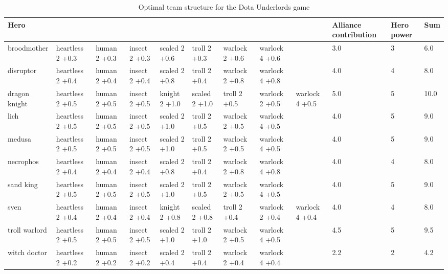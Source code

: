 \documentclass{article}
\begin{document}
\begin{table}
\resizebox{16cm}{!} {
\begin{tabular}{l| *{8}{p{1.6cm}} | *{3}{ p{1cm}} }
{Hero} &                   &               &                &                &                &                  &                  &                  &  Alliance contribution &  Hero power &   Sum \\
\midrule
broodmother   &  heartless 2 +0.3  &  human 2 +0.3  &  insect 2 +0.3  &  scaled 2 +0.6  &   troll 2 +0.3  &  warlock  2 +0.6  &  warlock  4 +0.6  &                   &                  3.0 &           3 &   6.0 \\
disruptor     &  heartless 2 +0.4  &  human 2 +0.4  &  insect 2 +0.4  &  scaled 2 +0.8  &   troll 2 +0.4  &  warlock  2 +0.8  &  warlock  4 +0.8  &                   &                  4.0 &           4 &   8.0 \\
dragon knight &  heartless 2 +0.5  &  human 2 +0.5  &  insect 2 +0.5  &  knight 2 +1.0  &  scaled 2 +1.0  &     troll 2 +0.5  &  warlock  2 +0.5  &  warlock  4 +0.5  &                  5.0 &           5 &  10.0 \\
lich          &  heartless 2 +0.5  &  human 2 +0.5  &  insect 2 +0.5  &  scaled 2 +1.0  &   troll 2 +0.5  &  warlock  2 +0.5  &  warlock  4 +0.5  &                   &                  4.0 &           5 &   9.0 \\
medusa        &  heartless 2 +0.5  &  human 2 +0.5  &  insect 2 +0.5  &  scaled 2 +1.0  &   troll 2 +0.5  &  warlock  2 +0.5  &  warlock  4 +0.5  &                   &                  4.0 &           5 &   9.0 \\
necrophos     &  heartless 2 +0.4  &  human 2 +0.4  &  insect 2 +0.4  &  scaled 2 +0.8  &   troll 2 +0.4  &  warlock  2 +0.8  &  warlock  4 +0.8  &                   &                  4.0 &           4 &   8.0 \\
sand king     &  heartless 2 +0.5  &  human 2 +0.5  &  insect 2 +0.5  &  scaled 2 +1.0  &   troll 2 +0.5  &  warlock  2 +0.5  &  warlock  4 +0.5  &                   &                  4.0 &           5 &   9.0 \\
sven          &  heartless 2 +0.4  &  human 2 +0.4  &  insect 2 +0.4  &  knight 2 +0.8  &  scaled 2 +0.8  &     troll 2 +0.4  &  warlock  2 +0.4  &  warlock  4 +0.4  &                  4.0 &           4 &   8.0 \\
troll warlord &  heartless 2 +0.5  &  human 2 +0.5  &  insect 2 +0.5  &  scaled 2 +1.0  &   troll 2 +1.0  &  warlock  2 +0.5  &  warlock  4 +0.5  &                   &                  4.5 &           5 &   9.5 \\
witch doctor  &  heartless 2 +0.2  &  human 2 +0.2  &  insect 2 +0.2  &  scaled 2 +0.4  &   troll 2 +0.4  &  warlock  2 +0.4  &  warlock  4 +0.4  &                   &                  2.2 &           2 &   4.2 \\
\bottomrule
\end{tabular}
}
\caption{Optimal team structure for the Dota Underlords game }
\label{table:solution}
\end{table}
\end{document}
